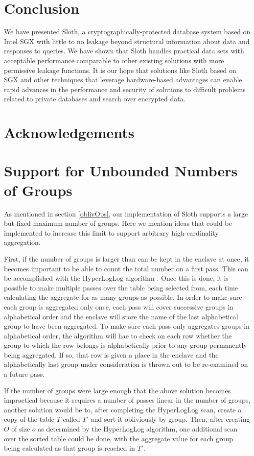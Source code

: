 \documentclass[USenglish,oneside,twocolumn]{article}
\def\name/{Sloth}
\begin{document}
\section{Conclusion}\label{conclusion}
We have presented \name/, a cryptographically-protected database system based on Intel SGX with little to no leakage beyond structural information about data and responses to queries. We have shown that \name/ handles practical data sets with acceptable performance comparable to other existing solutions with more permissive leakage functions. It is our hope that solutions like \name/ based on SGX and other techniques that leverage hardware-based advantages can enable rapid advances in the performance and security of solutions to difficult problems related to private databases and search over encrypted data. 

\section*{Acknowledgements}






\appendix

\section{Support for Unbounded Numbers of Groups}\label{groupby}
As mentioned in section \ref{oblivOps}, our implementation of \name/ supports a large but fixed maximum number of groups. Here we mention ideas that could be implemented to increase this limit to support arbitrary high-cardinality aggregation. 

First, if the number of groups is larger than can be kept in the enclave at once, it becomes important to be able to count the total number on a first pass. This can be accomplished with the HyperLogLog algorithm \cite{FFGM07}. Once this is done, it is possible to make multiple passes over the table being selected from, each time calculating the aggregate for as many groups as possible. In order to make sure each group is aggregated only once, each pass will cover successive groups in alphabetical order and the enclave will store the name of the last alphabetical group to have been aggregated. To make sure each pass only aggregates groups in alphabetical order, the algorithm will hae to check on each row whether the group to which the row belongs is alphabetically prior to any group permanently being aggregated. If so, that row is given a place in the enclave and the alphabetically last group under consideration is thrown out to be re-examined on a future pass. 

If the number of groups were large enough that the above solution becomes impractical because it requires a number of passes linear in the number of groups, another solution would be to, after completing the HyperLogLog scan, create a copy of the table $T$ called $T'$ and sort it obliviously by group. Then, after creating $O$ of size $o$ as determined by the HyperLogLog algorithm, one additional scan over the sorted table could be done, with the aggregate value for each group being calculated as that group is reached in $T'$. 
\end{document}

